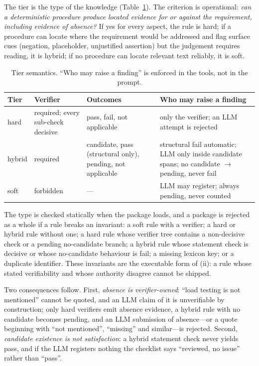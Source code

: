 \documentclass{IOS-Book-Article}
\begin{document}
The tier is the type of the knowledge (Table~\ref{tab:tiers}). The criterion is operational: \emph{can a deterministic procedure produce located evidence for or against the requirement, including evidence of absence?} If yes for every aspect, the rule is hard; if a procedure can locate where the requirement would be addressed and flag surface cues (negation, placeholder, unjustified assertion) but the judgement requires reading, it is hybrid; if no procedure can locate relevant text reliably, it is soft.

\begin{table}[t]
\caption{Tier semantics. ``Who may raise a finding'' is enforced in the tools, not in the prompt.}
\label{tab:tiers}
\centering
\footnotesize
\begin{tabular}{@{}p{1.0cm}p{3.4cm}p{2.7cm}p{3.3cm}@{}}
\toprule
Tier & Verifier & Outcomes & Who may raise a finding \\
\midrule
hard & required; every sub-check decisive & pass, fail, not applicable & only the verifier; an LLM attempt is rejected \\
hybrid & required & candidate, pass (structural only), pending, not applicable & structural fail automatic; LLM only inside candidate spans; no candidate $\rightarrow$ pending, never fail \\
soft & forbidden & --- & LLM may register; always pending, never counted \\
\bottomrule
\end{tabular}
\end{table}

The type is checked statically when the package loads, and a package is rejected as a whole if a rule breaks an invariant: a soft rule with a verifier; a hard or hybrid rule without one; a hard rule whose verifier tree contains a non-decisive check or a pending no-candidate branch; a hybrid rule whose statement check is decisive or whose no-candidate behaviour is fail; a missing lexicon key; or a duplicate identifier. These invariants are the executable form of (ii): a rule whose stated verifiability and whose authority disagree cannot be shipped.

Two consequences follow. First, \emph{absence is verifier-owned}: ``load testing is not mentioned'' cannot be quoted, and an LLM claim of it is unverifiable by construction; only hard verifiers emit absence evidence, a hybrid rule with no candidate becomes pending, and an LLM submission of absence---or a quote beginning with ``not mentioned'', ``missing'' and similar---is rejected. Second, \emph{candidate existence is not satisfaction}: a hybrid statement check never yields pass, and if the LLM registers nothing the checklist says ``reviewed, no issue'' rather than ``pass''.
\end{document}
